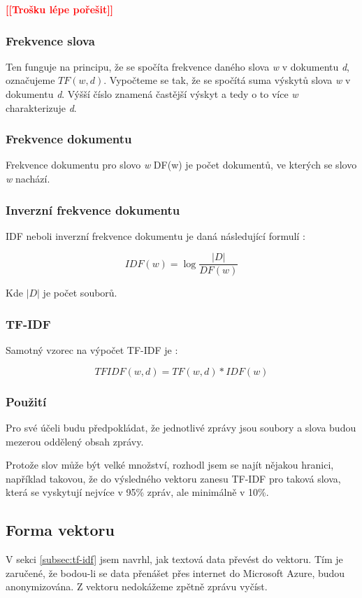 \documentclass[thesis=M,czech]{FITthesis}[2012/10/20]
\newcommand{\todo}[1]{\textcolor{red}{\textbf{[[#1]]}}}
\begin{document}
		\todo{Trošku lépe pořešit}
		\subsubsection{Frekvence slova}
		Ten funguje na principu, že se spočíta frekvence daného slova \textit{w} v dokumentu \textit{d}, označujeme $TF(w,d)$. Vypočteme se tak, že se spočítá suma výskytů slova \textit{w} v dokumentu \textit{d}. Výšší číslo znamená častější výskyt a tedy o to více \textit{w} charakterizuje \textit{d}.
		
		\subsubsection{Frekvence dokumentu}
		Frekvence dokumentu pro slovo \textit{w} DF(w) je počet dokumentů, ve kterých se slovo \textit{w} nachází.
		
		\subsubsection{Inverzní frekvence dokumentu}
		IDF neboli inverzní frekvence dokumentu je daná následující formulí \cite{Ramos_0}:
		
		$$ IDF(w) = \log{\frac{|D|}{DF(w)}}$$  
		
		Kde $|D|$ je počet souborů.
		
		\subsubsection{TF-IDF}
		Samotný vzorec na výpočet TF-IDF je \cite{Neto_0}: 
		
		$$TFIDF(w,d) = TF(w,d) * IDF(w) $$
		
		\subsubsection{Použití}
		Pro své účeli budu předpokládat, že jednotlivé zprávy jsou soubory a slova budou mezerou oddělený obsah zprávy. 
		
		Protože slov může být velké množství, rozhodl jsem se najít nějakou hranici, například takovou, že do výsledného vektoru zanesu TF-IDF pro taková slova, která se vyskytují nejvíce v 95\% zpráv, ale minimálně v 10\%.
		
		\subsection{Forma vektoru}
		V sekci \ref{subsec:tf-idf} jsem navrhl, jak textová data převést do vektoru. Tím je zaručené, že bodou-li se data přenášet přes internet do Microsoft Azure, budou anonymizována. Z vektoru nedokážeme zpětně zprávu vyčíst.
		
\end{document}
